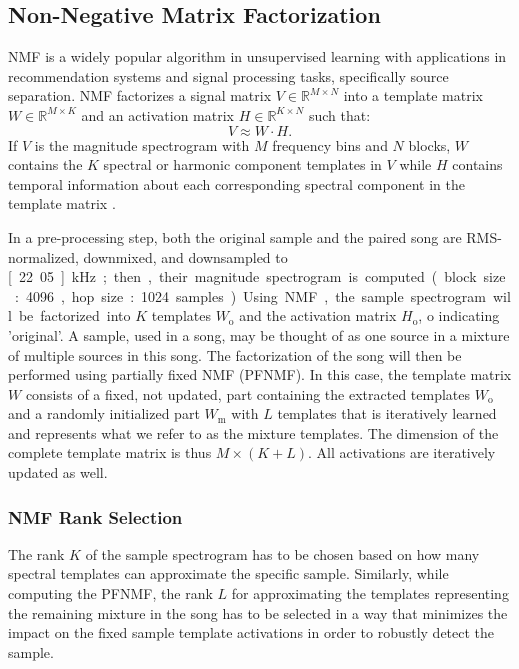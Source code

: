 \documentclass{article}
\begin{document}
\subsection{Non-Negative Matrix Factorization}
NMF is a widely popular algorithm in unsupervised learning with applications in recommendation systems\cite{ma2008sorec,koren2009matrix,luo2014efficient} and signal processing tasks, specifically source separation\cite{lee1999learning,smaragdis2014static,virtanen2007monaural}. NMF factorizes a signal matrix $V \in \mathbb{R}^{M\times N}$ into a template matrix $W \in \mathbb{R}^{M\times K}$ and an activation matrix $H \in \mathbb{R}^{K\times N}$ such that:
\begin{equation}
    V \approx W\cdot H.
\end{equation}
If $V$ is the magnitude spectrogram with $M$ frequency bins and $N$ blocks, $W$ contains the $K$ spectral or harmonic component templates in $V$ while $H$ contains temporal information about each corresponding spectral component in the template matrix \cite{smaragdis2003non}.

In a pre-processing step, both the original sample and the paired song are RMS-normalized, downmixed, and downsampled to \unit[22.05]{kHz}; then, their magnitude spectrogram is computed (block size: 4096, hop size: 1024 samples). %
Using NMF, the sample spectrogram will be factorized into $K$ templates $W_\mathrm{o}$ and the activation matrix $H_\mathrm{o}$, $\mathrm{o}$ indicating 'original'. A sample, used in a song, may be thought of as one source in a mixture of multiple sources in this song. 
The factorization of the song will then be performed using partially fixed NMF (PFNMF)\cite{wu_drum_2015,wu2015drum}. In this case, the template matrix $W$ consists of a fixed, not updated, part containing the extracted templates $W_\mathrm{o}$ and a randomly initialized part $W_\mathrm{m}$ with $L$ templates that is iteratively learned and represents what we refer to as the mixture templates. The dimension of the complete template matrix is thus $M\times (K+L)$. All activations are iteratively updated as well.

\subsubsection{NMF Rank Selection}
\label{nmfrank}
The rank $K$ of the sample spectrogram has to be chosen based on how many spectral templates can approximate the specific sample. Similarly, while computing the PFNMF, the rank $L$ for approximating the templates representing the remaining mixture in the song has to be selected in a way that minimizes the impact on the fixed sample template activations in order to robustly detect the sample.
\end{document}
